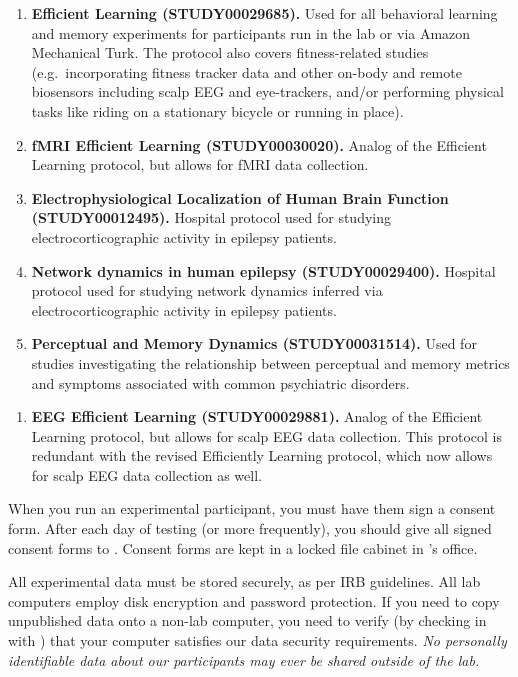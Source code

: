 \documentclass{tufte-book} %
\begin{document}
 \begin{enumerate}
 \item \textbf{Efficient Learning (STUDY00029685).}  Used for all
   behavioral learning and memory experiments for participants run in
   the lab or via Amazon Mechanical Turk.  The protocol also covers
   fitness-related studies (e.g.\ incorporating fitness tracker data
   and other on-body and remote biosensors including scalp EEG and
   eye-trackers, and/or performing physical tasks like riding on a
   stationary bicycle or running in place).
    \item \textbf{fMRI Efficient Learning (STUDY00030020).}  Analog of
      the Efficient Learning protocol, but allows for fMRI data
      collection.
    \item \textbf{Electrophysiological Localization of Human Brain
        Function (STUDY00012495).}  Hospital protocol used for
      studying electrocorticographic activity in epilepsy patients.
    \item \textbf{Network dynamics in human epilepsy (STUDY00029400).}
      Hospital protocol used for studying network dynamics inferred
      via electrocorticographic activity in epilepsy patients.
    \item \textbf{Perceptual and Memory Dynamics (STUDY00031514).}
    Used for studies investigating the relationship between perceptual and
    memory metrics and symptoms associated with common psychiatric disorders.
    
   \end{enumerate}

 \begin{enumerate}
   \item \textbf{EEG Efficient Learning (STUDY00029881).} Analog of
     the Efficient Learning protocol, but allows for scalp EEG data
     collection.  This protocol is redundant with the revised
     Efficiently Learning protocol, which now allows for scalp EEG
     data collection as well.
   \end{enumerate}

   When you run an experimental participant, you must have them sign a
   consent form.  After each day of testing (or more frequently), you
   should give all signed consent forms to \coordinator.  Consent
   forms are kept in a locked file cabinet in \director 's office.

   All experimental data must be stored securely, as per IRB
   guidelines.  All lab computers employ disk encryption and password
   protection.  If you need to copy unpublished data onto a non-lab
   computer, you need to verify (by checking in with \director) that
   your computer satisfies our data security requirements.  \textit{No
   personally identifiable data about our participants may ever be
   shared outside of the lab.}
\end{document}
